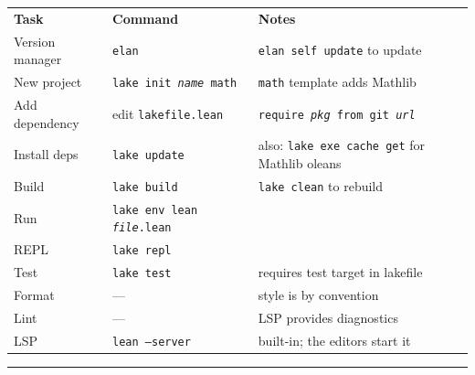 \documentclass[10pt]{extarticle}
\begin{document}
\small


\begin{tabularx}{\linewidth}{@{}l@{\quad}l@{\quad}Y@{}}
\textbf{Task}        & \textbf{Command}                                  & \textbf{Notes} \\[2pt]
Version manager      & \texttt{elan}                                      & \texttt{elan self update} to update \\
New project          & \texttt{lake init \textit{name} math}              & \texttt{math} template adds Mathlib \\
Add dependency       & edit \texttt{lakefile.lean}                        & \texttt{require \textit{pkg} from git \textit{url}} \\
Install deps         & \texttt{lake update}                               & also: \texttt{lake exe cache get} for Mathlib oleans \\
Build                & \texttt{lake build}                                & \texttt{lake clean} to rebuild \\
Run                  & \texttt{lake env lean \textit{file}.lean}          & \\
REPL                 & \texttt{lake repl}                                 & \\
Test                 & \texttt{lake test}                                 & requires test target in lakefile \\
Format               & ---                                                & style is by convention \\
Lint                 & ---                                                & LSP provides diagnostics \\
LSP                  & \texttt{lean --server}                             & built-in; the editors start it \\
\end{tabularx}

\vspace{6pt}
\rule{\linewidth}{0.2pt}
\end{document}

